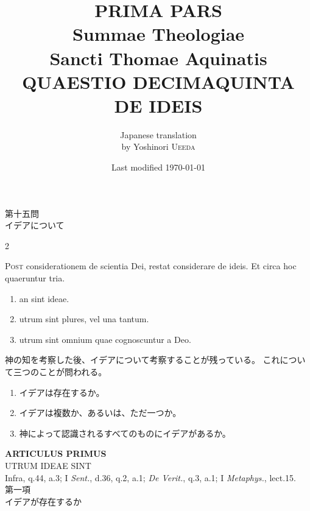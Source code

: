 \documentclass[paper=a4paper,fontsize=10pt,jafontsize=9pt,titlepage]{jlreq}
\title{{\bfseries PRIMA PARS}\\{\Huge Summae Theologiae}\\Sancti Thomae
Aquinatis\\{\sffamily QUAESTIO DECIMAQUINTA}\\DE IDEIS}
\author{Japanese translation\\by Yoshinori {\scshape Ueeda}}
\date{Last modified \today}
\begin{document}
\maketitle
\pagestyle{fancy}

\begin{center}
{\Large 第十五問\\イデアについて}
\end{center}

\begin{paracol}{2}

{\huge P}{\scshape ost} considerationem de scientia Dei, restat
 considerare de ideis. Et circa hoc quaeruntur tria. 

\begin{enumerate}
 \item an sint ideae.
 \item utrum sint plures, vel una tantum.
 \item utrum sint omnium quae cognoscuntur a Deo.
\end{enumerate}

\switchcolumn

神の知を考察した後、イデアについて考察することが残っている。
これについて三つのことが問われる。

\begin{enumerate}
 \item イデアは存在するか。
 \item イデアは複数か、あるいは、ただ一つか。
 \item 神によって認識されるすべてのものにイデアがあるか。
\end{enumerate}

\end{paracol}

\newpage

\begin{center}
 {\Large {\bfseries ARTICULUS PRIMUS}}\\
 {\large UTRUM IDEAE SINT}\\
 {\footnotesize Infra, q.44, a.3; I {\itshape Sent.}, d.36, q.2,
 a.1; {\itshape De Verit.}, q.3, a.1; I {\itshape Metaphys.}, lect.15.}\\
 {\Large 第一項\\イデアが存在するか}
\end{center}

{}
\setcounter{section}{1}
\setcounter{subsection}{0}
\end{document}
